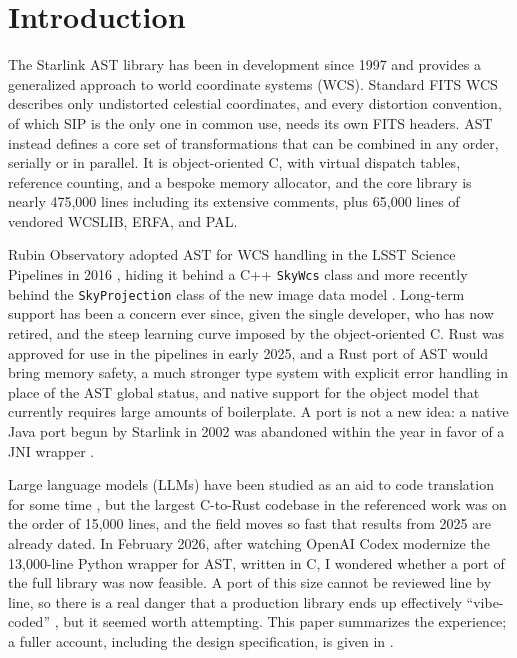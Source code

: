 \section{Introduction}

The Starlink AST library \citep{1998ASPC..145...41W,2016A&C....15...33B} has been in development since 1997 and provides a generalized approach to world coordinate systems (WCS).
Standard FITS WCS \citep{2002A&A...395.1077C} describes only undistorted celestial coordinates, and every distortion convention, of which SIP \citep{2005ASPC..347..491S} is the only one in common use, needs its own FITS headers.
AST instead defines a core set of transformations that can be combined in any order, serially or in parallel.
It is object-oriented C, with virtual dispatch tables, reference counting, and a bespoke memory allocator, and the core library is nearly 475,000 lines including its extensive comments, plus 65,000 lines of vendored WCSLIB, ERFA, and PAL.

Rubin Observatory adopted AST for WCS handling in the LSST Science Pipelines in 2016 \citep{DMTN-010}, hiding it behind a C++ \texttt{SkyWcs} class and more recently behind the \texttt{SkyProjection} class of the new image data model \citep{2026SPIE14155E..17B}.
Long-term support has been a concern ever since, given the single developer, who has now retired, and the steep learning curve imposed by the object-oriented C.
Rust was approved for use in the pipelines in early 2025, and a Rust port of AST would bring memory safety, a much stronger type system with explicit error handling in place of the AST global status, and native support for the object model that currently requires large amounts of boilerplate.
A port is not a new idea: a native Java port begun by Starlink in 2002 \citep{2003ASPC..295..445B} was abandoned within the year in favor of a JNI wrapper \citep{2004ASPC..314..412B}.

Large language models (LLMs) have been studied as an aid to code translation for some time \citep{10.1145/3729379,10.48550/arXiv.2511.20617}, but the largest C-to-Rust codebase in the referenced work was on the order of 15,000 lines, and the field moves so fast that results from 2025 are already dated.
In February 2026, after watching OpenAI Codex modernize the 13,000-line Python wrapper for AST, written in C, I wondered whether a port of the full library was now feasible.
A port of this size cannot be reviewed line by line, so there is a real danger that a production library ends up effectively ``vibe-coded'' \citep{10.48550/arXiv.2506.23253}, but it seemed worth attempting.
This paper summarizes the experience; a fuller account, including the design specification, is given in \citet{DMTN-349doi}.

